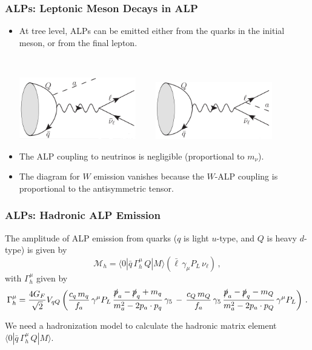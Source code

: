 \documentclass[mathserif, 10pt]{beamer}
\begin{document}
\begin{frame}\frametitle{ALPs: Leptonic Meson Decays in ALP}
    \begin{itemize}
        \item At tree level, ALPs can be emitted either from the quarks in the initial meson, or from the final lepton.
              \vspace{0.5cm}

              ~

              {\centering
              \includegraphics[width=0.4\textwidth]{figures/Lept1.1}$\qquad$
              \includegraphics[width=0.4\textwidth]{figures/Lept1.3}}
              \vspace{0.5cm}
        \item The ALP coupling to neutrinos is negligible (proportional to $m_\nu$).
        \item The diagram for $W$ emission vanishes because the $W$-ALP coupling is proportional to the antisymmetric tensor.
    \end{itemize}
\end{frame}

\begin{frame}\frametitle{ALPs: Hadronic ALP Emission}
    The amplitude of ALP emission from quarks ($q$ is light $u$-type, and $Q$ is heavy $d$-type) is given by
    $$\mathcal{M}_h = \langle 0 |\bar{q}\,\Gamma^\mu_{h}\,Q|M\rangle \left(\bar{\ell} \,\gamma_\mu P_L \,\nu_\ell \right)\,,$$
    with $\Gamma^\mu_h$ given by
        {\small $$\Gamma^\mu_h = \frac{4 G_F}{\sqrt{2}} V_{qQ}
                \left(\frac{c_q\,m_q}{f_a}\,\gamma^\mu P_L\,\frac{\slashed{p}_a-\slashed{p}_q+m_q}{m_a^2 -2 p_a \cdot p_q}\,\gamma_5
                \,-\, \frac{c_Q\,m_Q}{f_a}\,\gamma_5\,\frac{\slashed{p}_a-\slashed{p}_q-m_Q}{m_a^2- 2 p_a \cdot p_Q}\,\gamma^\mu P_L \right)\,.$$}

    We need a hadronization model to calculate the hadronic matrix element $ \langle 0 |\bar{q}\,\Gamma^\mu_{h}\,Q|M\rangle$.

\end{frame}
\end{document}
